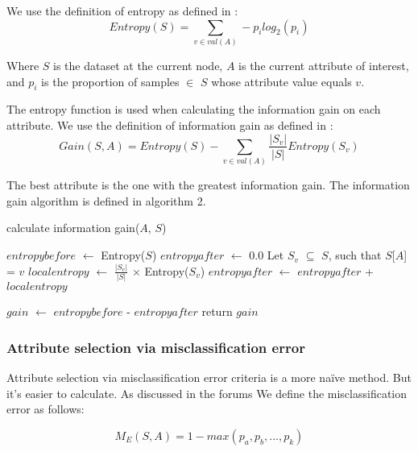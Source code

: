 \documentclass{IEEEtran}
\begin{document}
We use the definition of entropy as defined
in \parencite{mitchell1997machine}:
\begin{equation}
\label{entropy-equation}
Entropy(S) = \sum_{v\in val(A)}-p_ilog_2(p_i)
\end{equation}

Where $S$ is the dataset at the current node, $A$ is the current
attribute of interest, and $p_i$ is the proportion of samples $\in$ $S$
whose attribute value equals $v$.

The entropy function is used when calculating the information gain on
each attribute. We use the definition of information gain as defined
in \parencite{mitchell1997machine}:
\begin{equation}
\label{information-gain-equation}
Gain(S,A) = Entropy(S) -\sum_{v \in val(A)}\frac{|S_v|}{|S|}Entropy(S_v)
\end{equation}

The best attribute is the one with the greatest information gain. The
information gain algorithm is defined in algorithm 2.

\begin{algorithm}
\caption{calculate information gain($A$, $S$)}
\begin{algorithmic}
\Statex{}
\State $entropybefore$ $\leftarrow$ Entropy($S$)
\State $entropyafter$ $\leftarrow$ 0.0
  \State Let $S_v$ $\subseteq$ $S$, such that $S$[$A$] = $v$
  \State $localentropy$ $\leftarrow$ $\frac{|S_v|}{|S|}$ $\times$ Entropy($S_v$)
  \State $entropyafter$ $\leftarrow$ $entropyafter$ + $localentropy$
\EndFor

\State $gain$ $\leftarrow$ $entropybefore$ - $entropyafter$
\State return $gain$
\end{algorithmic}
\end{algorithm}


\subsubsection{Attribute selection via misclassification error}
Attribute selection via misclassification error criteria is a more
na{\"i}ve method. But it's easier to calculate. As discussed in the
forums We define the misclassification error as follows:

\begin{equation}
\label{misclassification-error-equation}
M_E(S,A) = 1 - max(p_a, p_b, ..., p_k) 
\end{equation}
\end{document}
